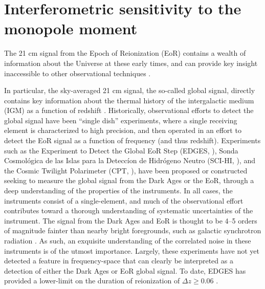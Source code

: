 \chapter{Interferometric sensitivity to the monopole moment}
\label{chapter:TAV}

The 21 cm signal from the Epoch of Reionization (EoR) contains a wealth of
information about the Universe at these early times, and can provide key insight
inaccessible to other observational techniques \citep{Loeb.12}. 

In particular, the sky-averaged 21 cm signal, the so-called global signal, directly
contains key information about the thermal history of the intergalactic medium
(IGM) as a function of redshift \citep{Pritchard.10}. Historically,
observational efforts to detect the global signal have been ``single dish''
experiments, where a single receiving element is characterized to high
precision, and then operated in an effort to detect the EoR signal as a function
of frequency (and thus redshift). Experiments such as the Experiment to Detect
the Global EoR Step (EDGES, \citealt{Bowman.10}), Sonda Cosmol\'{o}gica
de las Islas para la Detecc\'{i}on de Hidr\'{o}geno Neutro (SCI-HI,
\citealt{Voytek.14}), and the Cosmic Twilight Polarimeter (CPT,
\citealt{Nhan.16}), have been proposed or constructed seeking to measure
the global signal from the Dark Ages or the EoR, through a deep understanding of
the properties of the instruments. In all cases, the instruments consist of a
single-element, and much of the observational effort contributes toward a
thorough understanding of systematic uncertainties of the instrument. The signal
from the Dark Ages and EoR is thought to be 4--5 orders of magnitude fainter
than nearby bright foregrounds, such as galactic synchrotron radiation
\citep{McQuinn.07}. As such, an exquisite understanding of the correlated
noise in these instruments is of the utmost importance. Largely, these
experiments have not yet detected a feature in frequency-space that can clearly
be interpreted as a detection of either the Dark Ages or EoR global signal. To
date, EDGES has provided a lower-limit on the duration of reionization of
$\Delta z \geq 0.06$ \citep{Bowman.10}.
